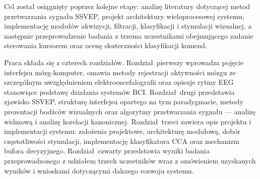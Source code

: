 Cel został osiągnięty poprzez kolejne etapy: analizę literatury
dotyczącej metod przetwarzania sygnału SSVEP, projekt architektury
wieloprocesowej systemu, implementację modułów akwizycji, filtracji,
klasyfikacji i stymulacji wizualnej, a następnie przeprowadzenie
badania z trzema uczestnikami obejmującego zadanie sterowania
kursorem oraz ocenę skuteczności klasyfikacji komend.

Praca składa się z czterech rozdziałów. Rozdział~pierwszy wprowadza
pojęcie interfejsu mózg-komputer, omawia metody rejestracji aktywności
mózgu ze szczególnym uwzględnieniem elektroencefalografii oraz opisuje
rytmy EEG stanowiące podstawę działania systemów BCI. Rozdział~drugi
przedstawia zjawisko SSVEP, strukturę interfejsu opartego na tym
paradygmacie, metody prezentacji bodźców wizualnych oraz algorytmy
przetwarzania sygnału --- analizę widmową i analizę korelacji
kanonicznej. Rozdział~trzeci zawiera opis projektu i implementacji
systemu: założenia projektowe, architekturę modułową, dobór częstotliwości
stymulacji, implementację klasyfikatora CCA oraz mechanizm bufora
decyzyjnego. Rozdział~czwarty przedstawia wyniki badania przeprowadzonego
z udziałem trzech uczestników wraz z omówieniem uzyskanych wyników
i wnioskami dotyczącymi dalszego rozwoju systemu.